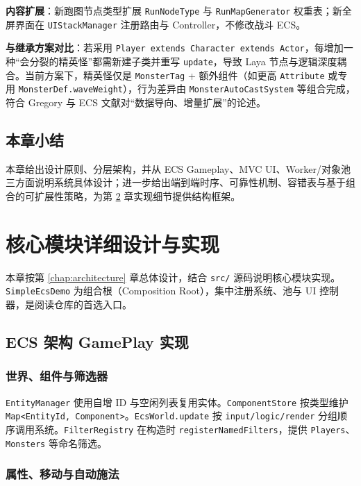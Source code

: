 \documentclass[UTF8,a4paper]{ctexart}
\begin{document}
\textbf{内容扩展}：新跑图节点类型扩展 \texttt{RunNodeType} 与 \texttt{RunMapGenerator} 权重表；新全屏界面在 \texttt{UIStackManager} 注册路由与 Controller，不修改战斗 ECS。

\textbf{与继承方案对比}：若采用 \texttt{Player extends Character extends Actor}，每增加一种“会分裂的精英怪”都需新建子类并重写 \texttt{update}，导致 Laya 节点与逻辑深度耦合。当前方案下，精英怪仅是 \texttt{MonsterTag} + 额外组件（如更高 \texttt{Attribute} 或专用 \texttt{MonsterDef.waveWeight}），行为差异由 \texttt{MonsterAutoCastSystem} 等组合完成，符合 Gregory 与 ECS 文献对“数据导向、增量扩展”的论述\cite{gregory2018game}。

\section{本章小结}

本章给出设计原则、分层架构，并从 ECS Gameplay、MVC UI、Worker/对象池三方面说明系统具体设计；进一步给出端到端时序、可靠性机制、容错表与基于组合的可扩展性策略，为第 \ref{chap:modules} 章实现细节提供结构框架。

\chapter{核心模块详细设计与实现}
\label{chap:modules}

本章按第 \ref{chap:architecture} 章总体设计，结合 \texttt{src/} 源码说明核心模块实现。\texttt{SimpleEcsDemo} 为组合根（Composition Root），集中注册系统、池与 UI 控制器，是阅读仓库的首选入口。

\section{ECS 架构 GamePlay 实现}
\label{sec:ecs-impl}

\subsection{世界、组件与筛选器}

\texttt{EntityManager} 使用自增 ID 与空闲列表复用实体。\texttt{ComponentStore} 按类型维护 \texttt{Map<EntityId, Component>}。\texttt{EcsWorld.update} 按 \texttt{input/logic/render} 分组顺序调用系统\cite{gregory2018game}。\texttt{FilterRegistry} 在构造时 \texttt{registerNamedFilters}，提供 \texttt{Players}、\texttt{Monsters} 等命名筛选。

\subsection{属性、移动与自动施法}
\end{document}
